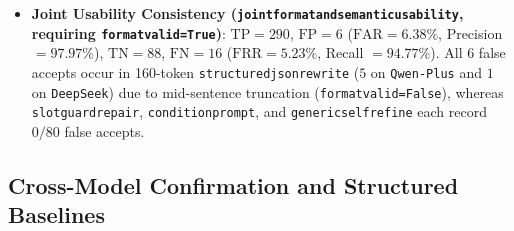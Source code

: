 \documentclass[10pt,twocolumn]{article}
\renewcommand{\_}{\textunderscore\allowbreak}
\begin{document}
\begin{enumerate}[leftmargin=*,nosep]
\begin{itemize}[leftmargin=*,nosep]
    \item \textbf{Joint Usability Consistency (\texttt{joint\_format\_and\_semantic\_usability}, requiring \texttt{format\_valid=True})}: $\text{TP}=290$, $\text{FP}=6$ ($\text{FAR}=6.38\%$, Precision $= 97.97\%$), $\text{TN}=88$, $\text{FN}=16$ ($\text{FRR}=5.23\%$, Recall $= 94.77\%$). All $6$ false accepts occur in 160-token \texttt{structured\_json\_rewrite} ($5$ on \texttt{Qwen-Plus} and $1$ on \texttt{DeepSeek}) due to mid-sentence truncation (\texttt{format\_valid=False}), whereas \texttt{slot\_guard\_repair}, \texttt{condition\_prompt}, and \texttt{generic\_self\_refine} each record $0/80$ false accepts.
  \end{itemize}
\end{enumerate}

\subsection{Cross-Model Confirmation and Structured Baselines}
\end{document}
